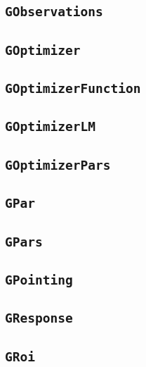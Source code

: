 \documentclass{article}[12pt,a4]
\begin{document}
\subsection{{\tt GObservations}}

\subsection{{\tt GOptimizer}}

\subsection{{\tt GOptimizerFunction}}

\subsection{{\tt GOptimizerLM}}

\subsection{{\tt GOptimizerPars}}

\subsection{{\tt GPar}}

\subsection{{\tt GPars}}

\subsection{{\tt GPointing}}

\subsection{{\tt GResponse}}

\subsection{{\tt GRoi}}
\end{document}
